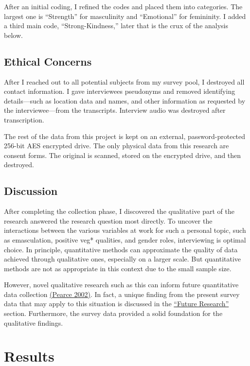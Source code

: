 \documentclass[twoside]{report}
\let\oldsection\section
\renewcommand\section{\clearpage\oldsection}
\begin{document}
\begin{multicols*}{2}
After an initial coding, I refined the codes and
placed them into categories. The largest one is ``Strength'' for
masculinity and ``Emotional'' for femininity. I added a third main code,
``Strong-Kindness,'' later that is the crux of the analysis below.

\subsection{Ethical Concerns}

After I reached out to all potential subjects from my survey pool, I
destroyed all contact information. I gave interviewees pseudonyms and removed identifying details---such as location data and names, and
other information as requested by the interviewee---from the
transcripts. Interview audio was destroyed after transcription.

The rest of the data from this project is kept on an external, password-protected 256-bit AES encrypted drive. The only physical data from this research are consent forms. The original is scanned, stored on the encrypted drive, and then destroyed.

\subsection{Discussion}

After completing the collection phase, I discovered the qualitative part
of the research answered the research question most directly. To uncover
the interactions between the various variables at work for such a
personal topic, such as emasculation, positive veg* qualities, and
gender roles, interviewing is optimal choice. In principle, quantitative
methods can approximate the quality of data achieved through qualitative
ones, especially on a larger scale. But quantitative methods are not as
appropriate in this context due to the small sample size.

However, novel qualitative research such as this can inform future
quantitative data collection \hyperlink{pearce}{(Pearce 2002)}. In fact, a unique finding from the present survey data that may apply to this situation is discussed in the \hyperlink{future-research}{``Future Research''} section. Furthermore, the survey data provided a solid foundation for the qualitative findings.

\section{Results}

\end{multicols*}
\end{document}
